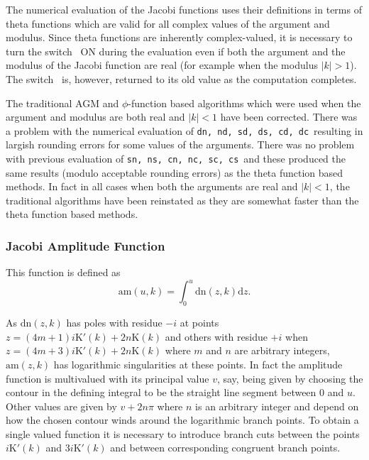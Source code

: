 The numerical evaluation of the Jacobi functions uses their definitions
in terms of theta functions which are valid for all complex values of the
argument and modulus.  Since theta functions are inherently complex-valued,
it is necessary to turn the switch \ ON during the evaluation even
if both the argument and the modulus of the Jacobi function are real (for
example when the modulus $|k|>1$). The switch \ is, however,
returned to its old value as the computation completes.

The traditional AGM and  $\phi$-function based algorithms which were
used when the argument and modulus are both real and $|k| < 1$ have been
corrected. There was a problem with the numerical evaluation
of \texttt{dn, nd, sd, ds, cd, dc}\ resulting in largish rounding errors for
some values of the arguments. There was no problem with previous evaluation of
\texttt{sn, ns, cn, nc, sc, cs}\ and these produced the same results (modulo
acceptable rounding errors) as the theta function based methods.
In fact in all cases when both the arguments are real and $|k|<1$, the
traditional algorithms have been reinstated as they are somewhat faster than the
theta function based methods.

\subsubsection{Jacobi Amplitude Function}
\hypertarget{operator:JACOBIAM}{}
This function is defined as
\[ \mathrm{am}(u,k) = \int_0^u\mathrm{dn}(z,k)\mathrm{d}z.\]

As $\mathrm{dn}(z,k)$ has poles with residue $-i$ at points
$z=(4m+1)i\mathrm{K}'(k)+2n\mathrm{K}(k)$ and others with residue $+i$ when
$z=(4m+3)i\mathrm{K}'(k)+2n\mathrm{K}(k)$ where $m$ and $n$ are arbitrary
integers, $\mathrm{am}(z,k)$ has logarithmic singularities at these points.
In fact the amplitude function is multivalued with its principal value $v$, say,
being given by choosing the contour in the defining integral to be the
straight line segment between $0$ and $u$.  Other values are given by $v+2n\pi$
where $n$ is an arbitrary integer and depend on how the chosen contour winds
around the logarithmic branch points.  To obtain a single valued function it is
necessary to introduce branch cuts between the points $i\mathrm{K}'(k)$ and
$3i\mathrm{K}'(k)$ and between corresponding congruent branch points.

